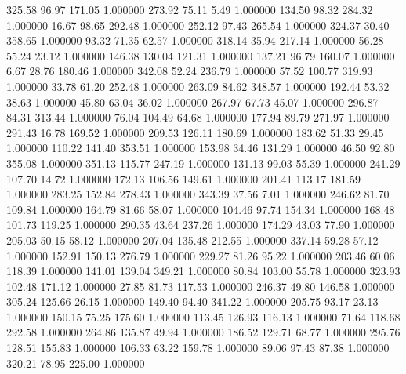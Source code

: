     325.58     96.97    171.05  1.000000
    273.92     75.11      5.49  1.000000
    134.50     98.32    284.32  1.000000
     16.67     98.65    292.48  1.000000
    252.12     97.43    265.54  1.000000
    324.37     30.40    358.65  1.000000
     93.32     71.35     62.57  1.000000
    318.14     35.94    217.14  1.000000
     56.28     55.24     23.12  1.000000
    146.38    130.04    121.31  1.000000
    137.21     96.79    160.07  1.000000
      6.67     28.76    180.46  1.000000
    342.08     52.24    236.79  1.000000
     57.52    100.77    319.93  1.000000
     33.78     61.20    252.48  1.000000
    263.09     84.62    348.57  1.000000
    192.44     53.32     38.63  1.000000
     45.80     63.04     36.02  1.000000
    267.97     67.73     45.07  1.000000
    296.87     84.31    313.44  1.000000
     76.04    104.49     64.68  1.000000
    177.94     89.79    271.97  1.000000
    291.43     16.78    169.52  1.000000
    209.53    126.11    180.69  1.000000
    183.62     51.33     29.45  1.000000
    110.22    141.40    353.51  1.000000
    153.98     34.46    131.29  1.000000
     46.50     92.80    355.08  1.000000
    351.13    115.77    247.19  1.000000
    131.13     99.03     55.39  1.000000
    241.29    107.70     14.72  1.000000
    172.13    106.56    149.61  1.000000
    201.41    113.17    181.59  1.000000
    283.25    152.84    278.43  1.000000
    343.39     37.56      7.01  1.000000
    246.62     81.70    109.84  1.000000
    164.79     81.66     58.07  1.000000
    104.46     97.74    154.34  1.000000
    168.48    101.73    119.25  1.000000
    290.35     43.64    237.26  1.000000
    174.29     43.03     77.90  1.000000
    205.03     50.15     58.12  1.000000
    207.04    135.48    212.55  1.000000
    337.14     59.28     57.12  1.000000
    152.91    150.13    276.79  1.000000
    229.27     81.26     95.22  1.000000
    203.46     60.06    118.39  1.000000
    141.01    139.04    349.21  1.000000
     80.84    103.00     55.78  1.000000
    323.93    102.48    171.12  1.000000
     27.85     81.73    117.53  1.000000
    246.37     49.80    146.58  1.000000
    305.24    125.66     26.15  1.000000
    149.40     94.40    341.22  1.000000
    205.75     93.17     23.13  1.000000
    150.15     75.25    175.60  1.000000
    113.45    126.93    116.13  1.000000
     71.64    118.68    292.58  1.000000
    264.86    135.87     49.94  1.000000
    186.52    129.71     68.77  1.000000
    295.76    128.51    155.83  1.000000
    106.33     63.22    159.78  1.000000
     89.06     97.43     87.38  1.000000
    320.21     78.95    225.00  1.000000
